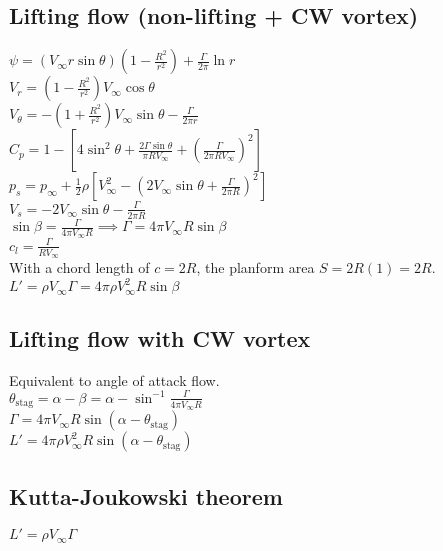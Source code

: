 \subsection*{Lifting flow (non-lifting + CW vortex)}
$\psi=\left(V_\infty r\sin\theta\right)\left(1-\frac{R^2}{r^2}\right)+\frac{\Gamma}{2\pi}\ln r$\\
$V_r=\left(1-\frac{R^2}{r^2}\right)V_\infty\cos\theta$\\
$V_\theta=-\left(1+\frac{R^2}{r^2}\right)V_\infty\sin\theta-\frac{\Gamma}{2\pi r}$\\
$C_p=1-\left[4\sin^2\theta+\frac{2\Gamma\sin\theta}{\pi R V_\infty}+\left(\frac{\Gamma}{2\pi R V_\infty}\right)^2\right]$\\
$p_s=p_\infty+\frac{1}{2}\rho\left[V_\infty^2-\left(2V_\infty\sin\theta+\frac{\Gamma}{2\pi R}\right)^2\right]$\\
$V_s=-2V_\infty\sin\theta-\frac{\Gamma}{2\pi R}$\\
$\sin\beta=\frac{\Gamma}{4\pi V_\infty R}\implies\Gamma=4\pi V_\infty R\sin\beta$\\
$c_l=\frac{\Gamma}{R V_\infty}$\\
With a chord length of $c=2R$, the planform area $S=2R(1)=2R$.\\
$L'=\rho V_\infty \Gamma=4\pi\rho V_\infty^2 R\sin\beta$
\subsection*{Lifting flow with CW vortex}
Equivalent to angle of attack flow.\\
$\theta_\text{stag}=\alpha-\beta=\alpha-\sin^{-1}\frac{\Gamma}{4\pi V_\infty R}$\\
$\Gamma = 4\pi V_\infty R\sin(\alpha-\theta_\text{stag})$\\
$L'=4\pi\rho V_\infty^2 R\sin(\alpha-\theta_\text{stag})$
\subsection*{Kutta-Joukowski theorem}
$L'=\rho V_\infty \Gamma$

